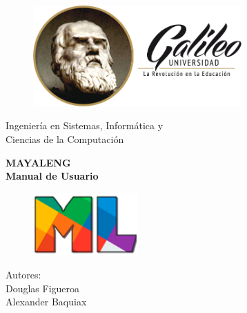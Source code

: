 \documentclass[landscape,12pt]{article}
\date{}
\begin{document}
\renewcommand{\headrulewidth}{0.0pt}
\renewcommand{\footrulewidth}{0.3pt}
\newpage

\begin{titlepage}
	\begin{center}
		\vspace*{-1in}
		\begin{figure}[htb]
			\begin{center}
				\includegraphics[width=8cm]{ug}
			\end{center}
		\end{figure}
		\vspace*{0.1in}
		\begin{Large}
			Ingenier\'ia en Sistemas, Inform\'atica y \\Ciencias de la Computaci\'on\\
		\end{Large}
		\vspace*{0.4in}
		\begin{LARGE}
			\textbf{\LARGE MAYALENG} \\
			\textbf{\Large Manual de Usuario} \\
			\begin{figure}[htb]
				\begin{center}
					\includegraphics[width=4cm]{ml}
				\end{center}
			\end{figure}
		\end{LARGE}
		\begin{large}
			Autores:\\
			Douglas Figueroa \\
			Alexander Baquiax
		\end{large}
	\end{center}
\end{titlepage}
\newpage

\cleardoublepage
\listoffigures
\end{document}
